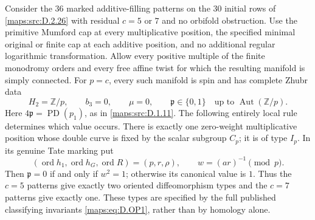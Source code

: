 \begin{theorem}\label{maps:src:D.2.36}


Consider the $36$ marked additive-filling patterns on the $30$ initial
rows of \ref{maps:src:D.2.26} with residual $c=5$ or $7$ and no orbifold obstruction.
Use the primitive Mumford cap at every multiplicative position, the
specified minimal original or finite cap at each additive position,
and no additional regular logarithmic transformation. Allow every
positive multiple of the finite monodromy orders and every free
affine twist for which the resulting manifold is simply connected.
For $p=c$, every such manifold is spin and has complete Zhubr data
\[
 H_2=\mathbb Z/p,\qquad b_3=0,\qquad \mu=0,
 \qquad \mathfrak p\in\{0,1\}\quad\text{up to }\operatorname{Aut}(\mathbb Z/p).
 \tag{D.OP1}\label{maps:eq:D.OP1}
\]
Here $4\mathfrak p=\operatorname{PD}(p_1)$, as in \ref{maps:src:D.1.11}.
The following entirely local rule determines which value occurs.
There is exactly one zero-weight multiplicative position
whose double curve is fixed by the scalar subgroup $C_p$; it is of
type $I_p$. In its genuine Tate marking put
\[
 (\operatorname{ord}h_1,\operatorname{ord}h_G,
                  \operatorname{ord}R)=(p,r,\rho),\qquad
 w=(ar)^{-1}\pmod p.
\]
Then $\mathfrak p=0$ if and only if $w^2=1$; otherwise its canonical
value is $1$. Thus the $c=5$ patterns give exactly two oriented
diffeomorphism types and the $c=7$ patterns give exactly one.
These types are specified by the full published classifying
invariants \eqref{maps:eq:D.OP1}, rather than by homology alone.

\end{theorem}


